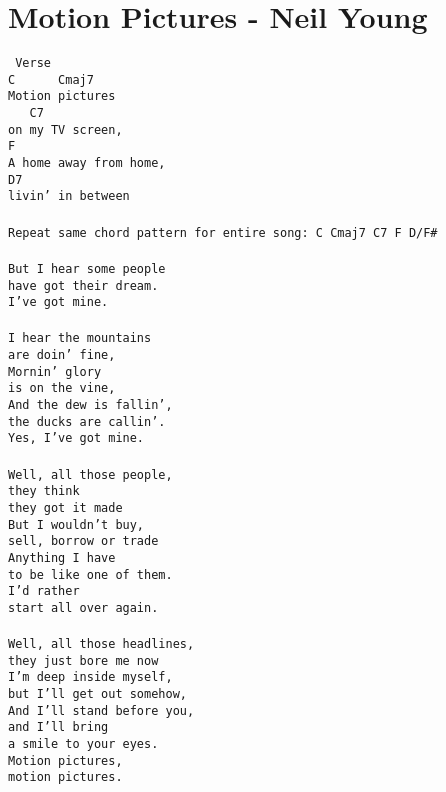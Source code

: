 \newpage
\section{Motion Pictures - Neil Young}
\label{Motion Pictures - Neil Young}
\texttt{\lbrack\ Verse\rbrack\\
C\ \ \ \ \ \ Cmaj7\\
Motion\ pictures\\
\ \ \ C7\\
on\ my\ TV\ screen,\\
F\\
A\ home\ away\ from\ home,\\
D7\\
livin'\ in\ between\\
\\
Repeat\ same\ chord\ pattern\ for\ entire\ song:\ C\ Cmaj7\ C7\ F\ D/F\#\ \\
\\
But\ I\ hear\ some\ people\\
have\ got\ their\ dream.\\
I've\ got\ mine.\\
\\
I\ hear\ the\ mountains\\
are\ doin'\ fine,\\
Mornin'\ glory\\
is\ on\ the\ vine,\\
And\ the\ dew\ is\ fallin',\\
the\ ducks\ are\ callin'.\\
Yes,\ I've\ got\ mine.\\
\\
Well,\ all\ those\ people,\\
they\ think\\
they\ got\ it\ made\\
But\ I\ wouldn't\ buy,\\
sell,\ borrow\ or\ trade\\
Anything\ I\ have\\
to\ be\ like\ one\ of\ them.\\
I'd\ rather\\
start\ all\ over\ again.\\
\\
Well,\ all\ those\ headlines,\\
they\ just\ bore\ me\ now\\
I'm\ deep\ inside\ myself,\\
but\ I'll\ get\ out\ somehow,\\
And\ I'll\ stand\ before\ you,\\
and\ I'll\ bring\\
a\ smile\ to\ your\ eyes.\\
Motion\ pictures,\\
motion\ pictures.\\
\\}
